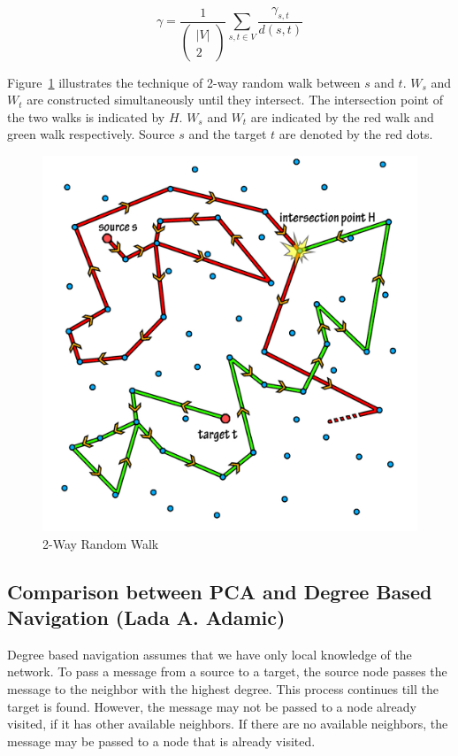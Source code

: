 \documentclass[a4paper,12pt]{article}
\begin{document}
$$\gamma = \frac{1}{\left(\begin{array}{c} |V|\\ 2\end{array}\right)} \sum_{s,t \in V} \frac{\gamma_{s,t}}{d(s,t)}$$

Figure~\ref{4_two_way} illustrates the technique of 2-way random walk between $s$ and $t$. 
$W_s$ and $W_t$ are constructed simultaneously until they intersect.
The intersection point of the two walks is indicated by $H$. $W_s$ and $W_t$ 
are indicated by the red walk and green walk respectively. Source $s$ and the 
target $t$ are denoted by the red dots. 

\begin{figure}[htp]
\centering
\includegraphics[scale=0.15]{Results/2rawrandomwalk.jpg}
\caption{2-Way Random Walk}
\label{4_two_way}
\end{figure}

\subsection{Comparison between PCA and Degree Based Navigation (Lada A. Adamic)}
Degree based navigation assumes that we have only local knowledge of the network. 
To pass a message from a source to a target, the source node passes the message to the neighbor with the highest degree. 
This process continues till the target is found. 
However, the message may not be passed to a node already visited, if it has other available neighbors. 
If there are no available neighbors, the message may be passed to a node that is already visited. 
\end{document}
